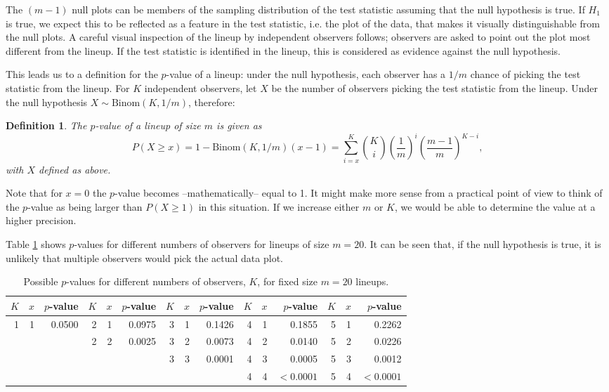 \documentclass{article}
\newtheorem{dfn}{Definition}[section]
\begin{document}
\noindent The $(m-1)$ null plots can be members of the sampling distribution of the test statistic assuming that the null hypothesis is true. If $H_1$ is true, we expect this to be reflected as a feature in the test statistic, i.e. the plot of the data, that makes it visually distinguishable from the null plots. A careful visual inspection of the lineup by %
independent observers follows;  observers are asked to point out the plot most different from the lineup. If the test statistic is identified in the lineup, this is considered as evidence against the null hypothesis. 

This leads us to a definition for the $p$-value of a lineup: under the null hypothesis, each observer has a $1/m$ chance of picking the test statistic from the lineup.  For $K$ independent observers, let $X$ be  the number of observers picking the test statistic from the lineup. Under the null hypothesis $X \sim \text{Binom}({K, 1/m})$,  therefore: 

\begin{dfn}\label{dfn:pvalue}
The $p$-value of a lineup of size $m$ is given as 
\[
P(X \ge x) = 1 - \text{Binom}({K, 1/m}) (x-1) = \sum_{i=x}^{K} {K \choose i} \left(\frac{1}{m}\right)^{i} \left(\frac{m-1}{m}\right)^{K-i},
\]
with $X$ defined as above. 
\end{dfn}
Note that for $x=0$ the $p$-value becomes --mathematically-- equal to 1. It might make more sense from a practical point of view to think of the $p$-value as
being larger than $P(X \ge 1)$ in this situation. If we increase either $m$ or $K$, we would be able to determine the value at a higher precision.

\noindent Table \ref{pvalue} shows $p$-values for different numbers of observers for lineups of size $m = 20$. It can be seen that, if the null hypothesis is true, it is unlikely that multiple observers would pick the actual data plot.

\begin{table}[htp]
\caption{Possible $p$-values for different numbers of observers, $K$, for fixed size $m = 20$ lineups.}
\begin{center}
\begin{tabular}{|rrr|rrr|rrr|rrr|rrr|}\hline
$K$ &  $x$ & $p$-value & $K$ &  $x$ & $p$-value & $K$ &  $x$ & $p$-value & $K$  & $x$ & $p$-value & $K$  & $x$ & $p$-value\\\hline
1 &  1 & 0.0500 & 2 &  1 & 0.0975 & 3 & 1 & 0.1426 & 4 & 1 & 0.1855 & 5 & 1 & 0.2262 \\%
&&& 2 &  2 & 0.0025 & 3 & 2 & 0.0073 & 4 & 2 & 0.0140 & 5 & 2 & 0.0226 \\
&&& &&& 3 & 3 & 0.0001 & 4 & 3 & 0.0005 & 5 & 3 & 0.0012 \\%
&&&  &    &        &   &   &        & 4 & 4 & $< 0.0001$ & 5 & 4 & $< 0.0001$ \\\hline
\end{tabular}
\end{center}
\label{pvalue}
\end{table}
\end{document}
